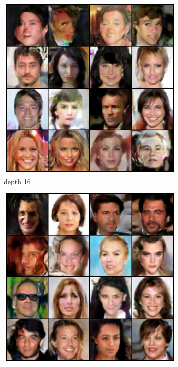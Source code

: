 \begin{figure}[H]
\begin{subfigure}[b]{0.24\textwidth}
        \includegraphics[width=\textwidth]{resources/images/output_celeba_16.eps}
        \caption{depth 16}
        \label{fig:celeba_16}
    \end{subfigure}
    \hfill
    \begin{subfigure}[b]{0.24\textwidth}
        \centering
        \includegraphics[width=\textwidth]{resources/images/output_celeba_32.eps}

\end{subfigure}
\end{figure}
